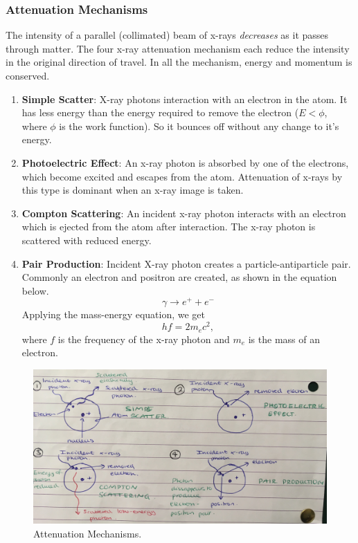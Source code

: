 \subsubsection*{Attenuation Mechanisms}
The intensity of a parallel (collimated) beam of x-rays \textit{decreases} as it passes through matter. The four x-ray attenuation mechanism each reduce the intensity in the original direction of travel. In all the mechanism, energy and momentum is conserved.
\begin{enumerate}
    \item \textbf{Simple Scatter}:
    X-ray photons interaction with an electron in the atom. It has less energy than the energy required to remove the electron ($E < \phi$, where $\phi$ is the work function). So it bounces off without any change to it's energy.
    \item \textbf{Photoelectric Effect}: An x-ray photon is absorbed by one of the electrons, which become excited and escapes from the atom. Attenuation of x-rays by this type is dominant when an x-ray image is taken.
    \item \textbf{Compton Scattering}: An incident x-ray photon interacts with an electron which is ejected from the atom after interaction. The x-ray photon is scattered with reduced energy. 
    \item \textbf{Pair Production}: Incident X-ray photon creates a particle-antiparticle pair. Commonly an electron and positron are created, as shown in the equation below. 
    \begin{equation}
        \gamma \longrightarrow e^+ + e^-
    \end{equation}
    Applying the mass-energy equation, we get
    \begin{equation}
        hf = 2m_e c^2,
    \end{equation}
    where $f$ is the frequency of the x-ray photon and $m_e$ is the mass of an electron.
\end{enumerate}

\begin{figure}[h!]
    \centering
    \includegraphics[scale=0.1]{notes/images/Attenuation.JPG}
    \caption{Attenuation Mechanisms.}
\end{figure}
\FloatBarrier

